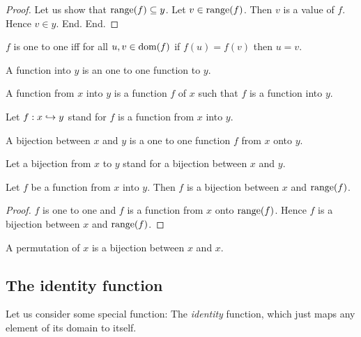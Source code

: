 \documentclass[../../set-theory.tex]{subfiles}
\begin{document}
\begin{forthel}
\begin{proof}
        Let us show that $\operatorname{range}(f) \subseteq y$.
          Let $v \in \operatorname{range}(f)$.
          Then $v$ is a value of $f$.
          Hence $v \in y$.
        End.
      End.
    \end{proof}

    \begin{definition}
      $f$ is one to one iff for all $u,v \in \operatorname{dom}(f)$ if $f(u) = f(v)$ then $u = v$.
    \end{definition}

    \begin{definition}
      A function into $y$ is an one to one function to $y$.
    \end{definition}

    \begin{definition}
      A function from $x$ into $y$ is a function $f$ of $x$ such that $f$ is a function into $y$.
    \end{definition}

    Let $f: x \hookrightarrow y$ stand for $f$ is a function from $x$ into $y$.

    \begin{definition}
      A bijection between $x$ and $y$ is a one to one function $f$ from $x$ onto $y$.
    \end{definition}

    Let a bijection from $x$ to $y$ stand for a bijection between $x$ and $y$.

    \begin{proposition}\label{SetTheory_02_01_717927}
      Let $f$ be a function from $x$ into $y$.
      Then $f$ is a bijection between $x$ and $\operatorname{range}(f)$.
    \end{proposition}
    \begin{proof}
      $f$ is one to one and $f$ is a function from $x$ onto $\operatorname{range}(f)$.
      Hence $f$ is a bijection between $x$ and $\operatorname{range}(f)$.
    \end{proof}

    \begin{definition}
      A permutation of $x$ is a bijection between $x$ and $x$.
    \end{definition}
  \end{forthel}


  \subsection{The identity function}

  Let us consider some special function:
  The \textit{identity} function, which just maps any element of its domain to
  itself.
\end{document}
